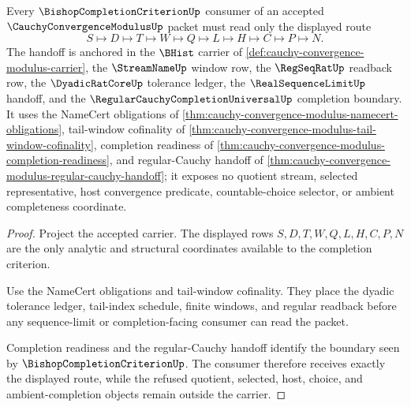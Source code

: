 \begin{theorem}
\label{thm:cauchy-convergence-modulus-bishop-criterion-handoff}
Every $\BishopCompletionCriterionUp$ consumer of an accepted $\CauchyConvergenceModulusUp$ packet must read only the displayed route
$$
S\longmapsto D\longmapsto T\longmapsto W\longmapsto Q\longmapsto L\longmapsto H\longmapsto C\longmapsto P\longmapsto N.
$$
The handoff is anchored in the $\BHist$ carrier of \autoref{def:cauchy-convergence-modulus-carrier}, the $\StreamNameUp$ window row, the $\RegSeqRatUp$ readback row, the $\DyadicRatCoreUp$ tolerance ledger, the $\RealSequenceLimitUp$ handoff, and the $\RegularCauchyCompletionUniversalUp$ completion boundary. It uses the NameCert obligations of \autoref{thm:cauchy-convergence-modulus-namecert-obligations}, tail-window cofinality of \autoref{thm:cauchy-convergence-modulus-tail-window-cofinality}, completion readiness of \autoref{thm:cauchy-convergence-modulus-completion-readiness}, and regular-Cauchy handoff of \autoref{thm:cauchy-convergence-modulus-regular-cauchy-handoff}; it exposes no quotient stream, selected representative, host convergence predicate, countable-choice selector, or ambient completeness coordinate.
\end{theorem}
\begin{proof}
Project the accepted carrier. The displayed rows $S,D,T,W,Q,L,H,C,P,N$ are the only analytic and structural coordinates available to the completion criterion.

Use the NameCert obligations and tail-window cofinality. They place the dyadic tolerance ledger, tail-index schedule, finite windows, and regular readback before any sequence-limit or completion-facing consumer can read the packet.

Completion readiness and the regular-Cauchy handoff identify the boundary seen by $\BishopCompletionCriterionUp$. The consumer therefore receives exactly the displayed route, while the refused quotient, selected, host, choice, and ambient-completion objects remain outside the carrier.
\end{proof}

